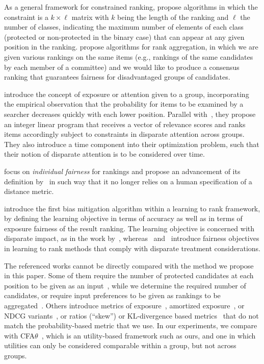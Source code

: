 As a general framework for constrained ranking, \citet{celis2017ranking} propose algorithms in which the constraint is a $k \times \ell$ matrix with $k$ being the length of the ranking and $\ell$ the number of classes, indicating the maximum number of elements of each class (protected or non-protected in the binary case) that can appear at any given position in the ranking.
%
\citet{kuhlman2020rank} propose algorithms for rank aggregation, in which we are given various rankings on the same items (e.g., rankings of the same candidates by each member of a committee) and we would like to produce a consensus ranking that guarantees fairness for disadvantaged groups of candidates.

\citet{singh2018fairness} introduce the concept of exposure or attention given to a group, incorporating the empirical observation that the probability for items to be examined by a searcher decreases quickly with each lower position.
%
Parallel with~\citet{biega2018equity}, they propose an integer linear program that receives a vector of relevance scores and ranks items accordingly subject to constraints in disparate attention across groups. They also introduce a time component into their optimization problem, such that their notion of disparate attention is to be considered over time.

\citet{lahoti2019operationalizing} focus on \emph{individual fairness} for rankings and propose an advancement of its definition by~\citet{Dwork2012} in such way that it no longer relies on a human specification of a distance metric.

\citet{zehlike2018reducing} introduce the first bias mitigation algorithm within a learning to rank framework, by defining the learning objective in terms of accuracy as well as in terms of exposure fairness of the result ranking.
%
The learning objective is concerned with disparate impact,
as in the work by~\citet{shang2020list},
whereas~\citet{beutel2019fairness} and~\citet{singh2019policy} introduce fairness objectives in learning to rank methods that comply with disparate treatment considerations.

The referenced works cannot be directly compared with the method we propose in this paper.
%
Some of them require the number of protected candidates at each position to be given as an input~\cite{celis2017ranking}, while we determine the required number of candidates, or require input preferences to be given as rankings to be aggregated~\cite{kuhlman2020rank}.
%
Others introduce metrics of exposure~\cite{singh2018fairness}, amortized exposure~\cite{biega2018equity}, or NDCG variants~\cite{yang2016measuring}, or ratios (``skew'') or KL-divergence based metrics~\cite{geyik2019fairness} that do not match the probability-based metric that we use.
%
In our experiments, we compare with CFA$\theta$~\cite{zehlike2020matching}, which is an utility-based framework such as ours, and one in which utilities can only be considered comparable within a group, but not across groups.

